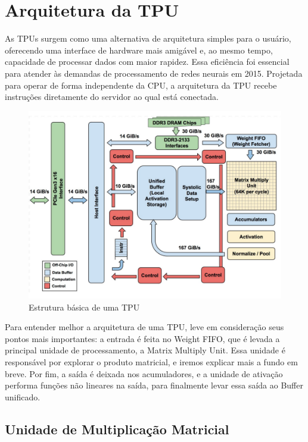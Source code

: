 \documentclass{report}
\begin{document}
\chapter{Arquitetura da TPU}

As TPUs surgem como uma alternativa de arquitetura simples para o usuário, oferecendo uma interface de hardware mais amigável e, ao mesmo tempo, capacidade de processar dados com maior rapidez. Essa eficiência foi essencial para atender às demandas de processamento de redes neurais em 2015. Projetada para operar de forma independente da CPU, a arquitetura da TPU recebe instruções diretamente do servidor ao qual está conectada.

\begin{figure}[h]
	\includegraphics[scale=0.7]{tpu-block-diagram}
	\centering
	\caption{Estrutura básica de uma TPU}
\end{figure}

Para entender melhor a arquitetura de uma TPU, leve em consideração seus pontos mais importantes: a entrada é feita no Weight FIFO, que é levada a principal unidade de processamento, a Matrix Multiply Unit. Essa unidade é responsável por explorar o produto matricial, e iremos explicar mais a fundo em breve. Por fim, a saída é deixada nos acumuladores, e a unidade de ativação performa funções não lineares na saída, para finalmente levar essa saída ao Buffer unificado.

\section{Unidade de Multiplicação Matricial}
\end{document}
